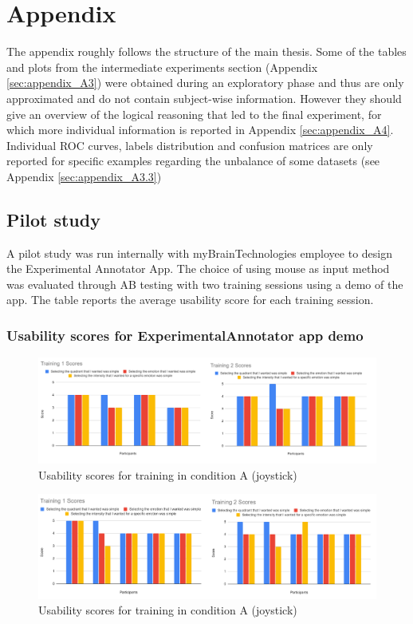\chapter{Appendix}
\label{app:appendix_A}
The appendix roughly follows the structure of the main thesis. Some of the tables and plots from the intermediate experiments section (Appendix \ref{sec:appendix_A3}) were obtained during an exploratory phase and thus are only approximated and do not contain subject-wise information. However they should give an overview of the logical reasoning that led to the final experiment, for which more individual information is reported in Appendix \ref{sec:appendix_A4}. Individual ROC curves, labels distribution and confusion matrices are only reported for specific examples regarding the unbalance of some datasets (see Appendix \ref{sec:appendix_A3.3})

\section{Pilot study}
\label{sec:appendix_A1}
A pilot study was run internally with myBrainTechnologies employee to design the Experimental Annotator App. The choice of using mouse as input method was evaluated through A\text{\textbar}B testing with two training sessions using a demo of the app. The table reports the average usability score for each training session.

\subsection{Usability scores for ExperimentalAnnotator app demo}
\label{sec:appendix_A1.1}

\begin{figure}[!htb]
\includegraphics[width=16cm]{img/appendix/usability_condition_A.png}
\centering
\caption{Usability scores for training in condition A (joystick)}\label{fig:usbility_condition_A}
\end{figure}

\begin{figure}[!htb]
\includegraphics[width=16cm]{img/appendix/usability_condition_B.png}
\centering
\caption{Usability scores for training in condition A (joystick)}\label{fig:usbility_condition_B}
\end{figure}

